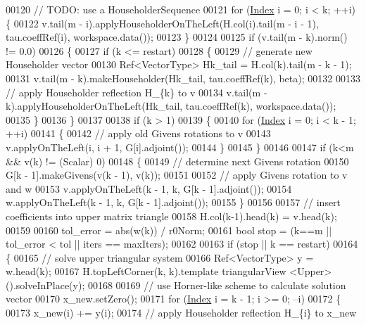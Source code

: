 \begin{DoxyCode}
00120     \textcolor{comment}{// TODO: use a HouseholderSequence}
00121     \textcolor{keywordflow}{for} (\hyperlink{namespace_eigen_a62e77e0933482dafde8fe197d9a2cfde}{Index} i = 0; i < k; ++i) \{
00122       v.tail(m - i).applyHouseholderOnTheLeft(H.col(i).tail(m - i - 1), tau.coeffRef(i), workspace.data());
00123     \}
00124 
00125     \textcolor{keywordflow}{if} (v.tail(m - k).norm() != 0.0)
00126     \{
00127       \textcolor{keywordflow}{if} (k <= restart)
00128       \{
00129         \textcolor{comment}{// generate new Householder vector}
00130         Ref<VectorType> Hk\_tail = H.col(k).tail(m - k - 1);
00131         v.tail(m - k).makeHouseholder(Hk\_tail, tau.coeffRef(k), beta);
00132 
00133         \textcolor{comment}{// apply Householder reflection H\_\{k\} to v}
00134         v.tail(m - k).applyHouseholderOnTheLeft(Hk\_tail, tau.coeffRef(k), workspace.data());
00135       \}
00136     \}
00137 
00138     \textcolor{keywordflow}{if} (k > 1)
00139     \{
00140       \textcolor{keywordflow}{for} (\hyperlink{namespace_eigen_a62e77e0933482dafde8fe197d9a2cfde}{Index} i = 0; i < k - 1; ++i)
00141       \{
00142         \textcolor{comment}{// apply old Givens rotations to v}
00143         v.applyOnTheLeft(i, i + 1, G[i].adjoint());
00144       \}
00145     \}
00146 
00147     \textcolor{keywordflow}{if} (k<m && v(k) != (Scalar) 0)
00148     \{
00149       \textcolor{comment}{// determine next Givens rotation}
00150       G[k - 1].makeGivens(v(k - 1), v(k));
00151 
00152       \textcolor{comment}{// apply Givens rotation to v and w}
00153       v.applyOnTheLeft(k - 1, k, G[k - 1].adjoint());
00154       w.applyOnTheLeft(k - 1, k, G[k - 1].adjoint());
00155     \}
00156 
00157     \textcolor{comment}{// insert coefficients into upper matrix triangle}
00158     H.col(k-1).head(k) = v.head(k);
00159 
00160     tol\_error = abs(w(k)) / r0Norm;
00161     \textcolor{keywordtype}{bool} stop = (k==m || tol\_error < tol || iters == maxIters);
00162 
00163     \textcolor{keywordflow}{if} (stop || k == restart)
00164     \{
00165       \textcolor{comment}{// solve upper triangular system}
00166       Ref<VectorType> y = w.head(k);
00167       H.topLeftCorner(k, k).template triangularView <Upper>().solveInPlace(y);
00168 
00169       \textcolor{comment}{// use Horner-like scheme to calculate solution vector}
00170       x\_new.setZero();
00171       \textcolor{keywordflow}{for} (\hyperlink{namespace_eigen_a62e77e0933482dafde8fe197d9a2cfde}{Index} i = k - 1; i >= 0; --i)
00172       \{
00173         x\_new(i) += y(i);
00174         \textcolor{comment}{// apply Householder reflection H\_\{i\} to x\_new}

\end{DoxyCode}

